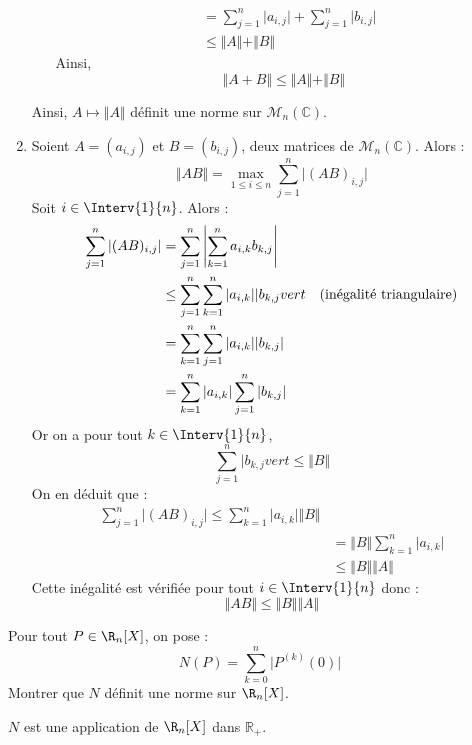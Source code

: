 \documentclass[a4paper,10pt]{report}
\begin{document}
\begin{enumerate}
\begin{itemize}
\begin{align*}
 & = \sum_{j=1}^n \vert a_{i,j} \vert + \sum_{j=1}^n \vert b_{i,j} \vert  \\
 & \leq \Vert A \Vert + \Vert B \Vert
 \end{align*}
Ainsi,
$$ \Vert A+B \Vert \leq \Vert A \Vert + \Vert B \Vert$$
\end{itemize}
Ainsi, $A \mapsto \Vert A \Vert$ définit une norme sur $\mathcal{M}_{n}(\mathbb{C})$.
\item Soient $A=(a_{i,j})$ et $B=(b_{i,j})$, deux matrices de $\mathcal{M}_n(\mathbb{C})$. Alors :
$$ \Vert AB \Vert = \max_{1 \leq i \leq n} \sum_{j=1}^n \vert (AB)_{i,j} \vert$$
Soit $i \in \Interv{1}{n}$. Alors :
\begin{align*}
\sum_{j=1}^n \vert (AB)_{i,j} \vert & = \sum_{j=1}^n \left\vert \sum_{k=1}^n a_{i,k} b_{k,j} \right\vert \\
& \leq  \sum_{j=1}^n  \sum_{k=1}^n \vert a_{i,k} \vert \vert b_{k,j} vert \quad \hbox{(inégalité triangulaire)} \\
& = \sum_{k=1}^n  \sum_{j=1}^n \vert a_{i,k} \vert \vert b_{k,j} \vert  \\
& =  \sum_{k=1}^n \vert a_{i,k} \vert  \sum_{j=1}^n \vert b_{k,j} \vert  
\end{align*}
Or on a pour tout $k \in \Interv{1}{n}$,
$$ \sum_{j=1}^n \vert b_{k,j} vert   \leq \Vert B \Vert$$
On en déduit que :
\begin{align*}
\sum_{j=1}^n \vert (AB)_{i,j} \vert  \leq  \sum_{k=1}^n \vert a_{i,k} \vert \Vert B \Vert \\
& = \Vert B \Vert  \sum_{k=1}^n \vert a_{i,k} \vert \\
& \leq \Vert B \Vert \Vert A \Vert
\end{align*}
Cette inégalité est vérifiée pour tout $i \in \Interv{1}{n}$ donc :
$$ \Vert AB \Vert \leq \Vert B \Vert \Vert A \Vert$$
\end{enumerate}


\begin{Exa} Pour tout $P  \in \R_n[X ]$, on pose :
$$N(P) = \sum_{k = 0}^{ n } \vert P^{(k)} (0) \vert $$
Montrer que $N$ définit une norme sur $\R_n [X]$.
\end{Exa}

\corr $N$ est une application de $\R_n[X ]$ dans $\mathbb{R}_+$.
\end{document}
